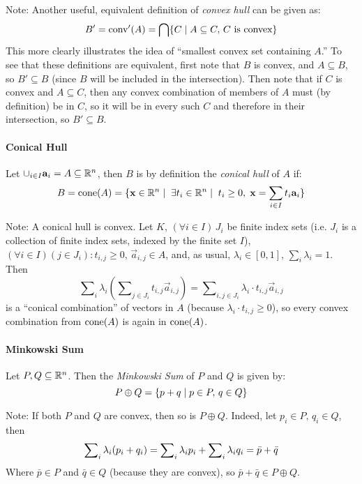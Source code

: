 Note: Another useful, equivalent definition of \textit{convex hull} can be given as:
\[ B' = \operatorname{conv}'(A) = \bigcap \{C \;|\; 
      A \subseteq C, \, C \text{ is convex}\} \]
This more clearly illustrates the idea of ``smallest convex set containing $A$.''  To see that these definitions are equivalent, first note that $B$ is convex, and $A \subseteq B$, so $B' \subseteq B$ (since $B$ will be included in the intersection).  Then note that if $C$ is convex and $A \subseteq C$, then any convex combination of members of $A$ must (by definition) be in $C$, so it will be in every such $C$ and therefore in their intersection, so $B' \subseteq B.$

\paragraph{Conical Hull}  Let $\cup_{i\in I} \mathbf{a}_i = A \subseteq \mathbb{R}^n$, then $B$ is by definition the \textit{conical hull} of $A$ if:
  \[ B = \operatorname{cone}(A) = \{ \mathbf{x}\in \mathbb{R}^n \;|\;\; \exists t_i \in \mathbb{R}^n \;|\; \; t_i \geq 0,\; \mathbf{x} = \sum_{i\in I} t_i\mathbf{a}_i \} \]

Note: A conical hull is convex.  Let $K,\, (\forall i\in I)\, J_i$ be finite index sets (i.e. $J_i$ is a collection of finite index sets, indexed by the finite set $I$), $(\forall i \in I)(j \in J_i): t_{i,j} \geq 0,\, \vec{a}_{i,j} \in A$, and, as usual, $\lambda_i \in [0,1],\, \sum_i \lambda_i = 1$.  Then
  \[ \sum\nolimits_i \lambda_i \left(\sum\nolimits_{j \in J_i} t_{i,j} \vec{a}_{i,j}\right) = \sum\nolimits_{i,j\in J_i} \lambda_i \cdot t_{i,j} \vec{a}_{i,j}\]
is a ``conical combination'' of vectors in $A$ (because $\lambda_i\cdot t_{i,j} \geq 0$), so every convex combination from $\operatorname{cone}(A)$ is again in $\operatorname{cone}(A)$.

\paragraph{Minkowski Sum}
Let $P,Q \subseteq \mathbb{R}^n$.  Then the \textit{Minkowski Sum} of $P$ and $Q$ is given by:
  \[ P \oplus Q = \{ p + q \;|\; p \in P,\, q \in Q \} \]

Note:  If both $P$ and $Q$ are convex, then so is $P \oplus Q$.  Indeed, let $p_i \in P,\, q_i \in Q$, then
  \[\sum_i\nolimits \lambda_i(p_i + q_i) = 
  \sum\nolimits_{i} \lambda_{i} p_{i} + \sum\nolimits_{i} \lambda_{i} q_{i} = 
  \bar{p} + \bar{q}
  \]
Where $\bar{p} \in P$ and $\bar{q} \in Q$ (because they are convex), so $\bar{p} + \bar{q} \in P \oplus Q$.

